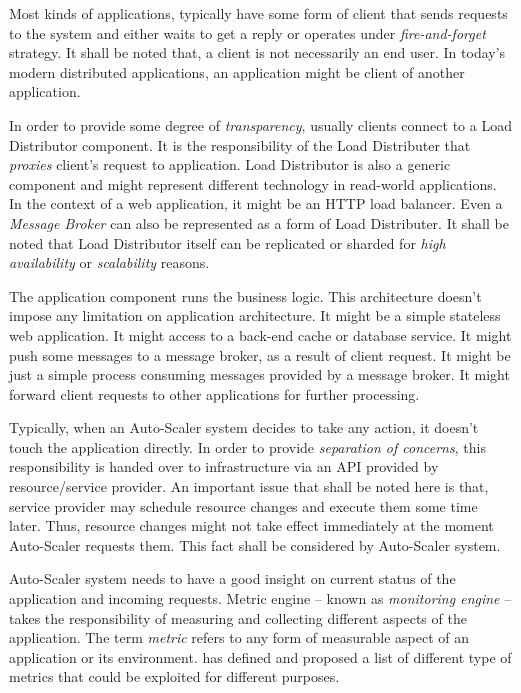 \begin{description}[leftmargin=0pt]
    \item[Clients] Most kinds of applications, typically have some form of client that sends requests to the system and either waits to get a reply or operates under \emph{fire-and-forget} strategy. It shall be noted that, a client is not necessarily an end user. In today's modern distributed applications, an application might be client of another application.
    \item[Load Distributor] In order to provide some degree of \emph{transparency}, usually clients connect to a Load Distributor component. It is the responsibility of the Load Distributer that \emph{proxies} client's request to application. Load Distributor is also a generic component and might represent different technology in read-world applications. In the context of a web application, it might be an HTTP load balancer. Even a \emph{Message Broker} can also be represented as a form of Load Distributer. It shall be noted that Load Distributor itself can be replicated or sharded for \emph{high availability} or \emph{scalability} reasons.
    \item[Application] The application component runs the business logic. This architecture doesn't impose any limitation on application architecture. It might be a simple stateless web application. It might access to a back-end cache or database service. It might push some messages to a message broker, as a result of client request. It might be just a simple process consuming messages provided by a message broker. It might forward client requests to other applications for further processing.
    \item[Infrastructure API] Typically, when an Auto-Scaler system decides to take any action, it doesn't touch the application directly. In order to provide \emph{separation of concerns}, this responsibility is handed over to infrastructure via an API provided by resource/service provider. An important issue that shall be noted here is that, service provider may schedule resource changes and execute them some time later. Thus, resource changes might not take effect immediately at the moment Auto-Scaler requests them. This fact shall be considered by Auto-Scaler system.
    \item[Metric Engine] Auto-Scaler system needs to have a good insight on current status of the application and incoming requests. Metric engine -- known as \emph{monitoring engine} -- takes the responsibility of measuring and collecting different aspects of the application. The term \emph{metric} refers to any form of measurable aspect of an application or its environment. \textcite{Ghanbari:2011} has defined and proposed a list of different type of metrics that could be exploited for different purposes.

\end{description}
